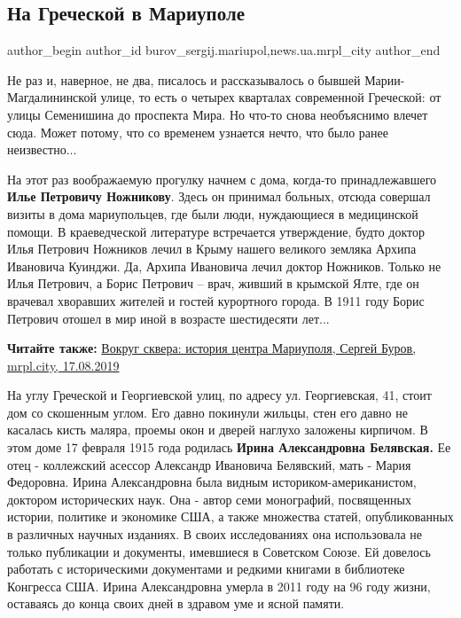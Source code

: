  
 
 
 
 
 
\subsection{На Греческой в Мариуполе}
\label{sec:09_11_2019.stz.news.ua.mrpl_city.1.na_grecheskoj_v_mariupole}
 
\ifcmt
 author_begin
   author_id burov_sergij.mariupol,news.ua.mrpl_city
 author_end
\fi

Не раз и, наверное, не два, писалось и рассказывалось о бывшей
Марии-Магдалининской улице, то есть о четырех кварталах современной Греческой:
от улицы Семенишина до проспекта Мира. Но что-то снова необъяснимо влечет сюда.
Может потому, что со временем узнается нечто, что было ранее неизвестно...


На этот раз воображаемую прогулку начнем с дома, когда-то принадлежавшего \textbf{Илье
Петровичу Ножникову}. Здесь он принимал больных, отсюда совершал визиты в дома
мариупольцев, где были люди, нуждающиеся в медицинской помощи. В краеведческой
литературе встречается утверждение, будто доктор Илья Петрович Ножников лечил в
Крыму нашего великого земляка Архипа Ивановича Куинджи. Да, Архипа Ивановича
лечил доктор Ножников. Только не Илья Петрович, а Борис Петрович – врач, живший
в крымской Ялте, где он врачевал хворавших жителей и гостей курортного города.
В 1911 году Борис Петрович отошел в мир иной в возрасте шестидесяти лет...

\textbf{Читайте также:} \href{https://mrpl.city/blogs/view/vokrug-skvera-istoriya-tsentra-mariupolya}{%
Вокруг сквера: история центра Мариуполя, Сергей Буров, mrpl.city, 17.08.2019}

На углу Греческой и Георгиевской улиц, по адресу ул. Георгиевская, 41, стоит
дом со скошенным углом. Его давно покинули жильцы, стен его давно не касалась
кисть маляра, проемы окон и дверей наглухо заложены кирпичом. В этом доме 17
февраля 1915 года родилась \textbf{Ирина Александровна Белявская.} Ее отец - коллежский
асессор Александр Ивановича Белявский, мать - Мария Федоровна. Ирина
Александровна была видным историком-американистом, доктором исторических наук.
Она - автор семи монографий, посвященных истории, политике и экономике США, а
также множества статей, опубликованных в различных научных изданиях. В своих
исследованиях она использовала не только публикации и документы, имевшиеся в
Советском Союзе. Ей довелось работать с историческими документами и редкими
книгами в библиотеке Конгресса США. Ирина Александровна умерла в 2011 году на
96 году жизни, оставаясь до конца своих дней в здравом уме и ясной памяти.

